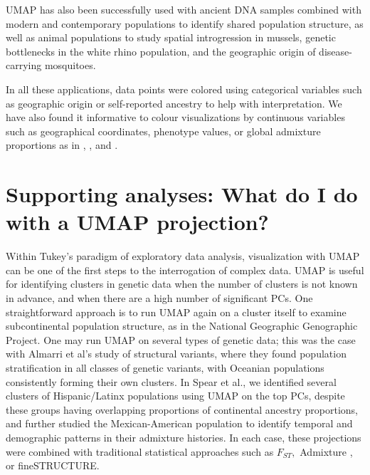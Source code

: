 \documentclass[12pt]{article}
\begin{document}
UMAP has also been successfully used with ancient DNA samples combined with modern and contemporary populations to identify shared population structure\cite{margaryan_population_2019}, as well as animal populations to study spatial introgression in mussels\cite{simon_local_2019}, genetic bottlenecks in the white rhino population\cite{sanchez-barreiro_historical_2020}, and the geographic origin of disease-carrying mosquitoes\cite{consortium_genome_2020}\cite{schmidt_population_2020}. 

In all these applications, data points were colored using categorical variables such as geographic origin or self-reported ancestry to help with interpretation. We have also found it informative to colour visualizations by continuous variables such as geographical coordinates, phenotype values, or global admixture proportions as in \cite{diaz-papkovich_umap_2019}, \cite{dai_population_2020}, and \cite{spear2020recent}.

\section*{Supporting analyses: What do I do with a UMAP projection?}
Within Tukey's paradigm of exploratory data analysis, visualization with UMAP can be one of the first steps to the interrogation of complex data\cite{holmes2018modern}. UMAP is useful for identifying clusters in genetic data when the number of clusters is not known in advance\cite{tonkin-hill_fast_2019}, and when there are a high number of significant PCs\cite{diaz-papkovich_umap_2019}. One straightforward approach is to run UMAP again on a cluster itself to examine subcontinental population structure, as in the National Geographic Genographic Project\cite{dai_population_2020}. One may run UMAP on several types of genetic data; this was the case with Almarri et al's study of structural variants, where they found population stratification in all classes of genetic variants, with Oceanian populations consistently forming their own clusters\cite{almarri_population_2020}. In Spear et al., we identified several clusters of Hispanic/Latinx populations using UMAP on the top PCs, despite these groups having overlapping proportions of continental ancestry proportions, and further studied the Mexican-American population to identify temporal and demographic patterns in their admixture histories\cite{spear2020recent}. In each case, these projections were combined with traditional statistical approaches such as $F_{ST},$ Admixture \cite{}, or fineSTRUCTURE\cite{lawson2012inference}.
\end{document}
